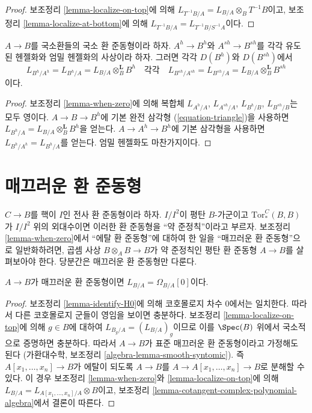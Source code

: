 \begin{proof}
보조정리 \ref{lemma-localize-on-top}에 의해
$L_{T^{-1}B/A}=L_{B/A}\otimes_BT^{-1}B$이고, 보조정리
\ref{lemma-localize-at-bottom}에 의해
$L_{T^{-1}B/A}=L_{T^{-1}B/S^{-1}A}$이다.
\end{proof}

\begin{lemma}
\label{lemma-cotangent-complex-henselization}
$A\to B$를 국소환들의 국소 환 준동형이라 하자. $A^h\to B^h$와
$A^{sh}\to B^{sh}$를 각각 유도된 헨젤화와 엄밀 헨젤화의 사상이라 하자.
그러면 각각 $D(B^h)$와 $D(B^{sh})$에서
$$
L_{B^h/A^h} = L_{B^h/A} = L_{B/A} \otimes_B^\mathbf{L} B^h
\quad\text{각각}\quad
L_{B^{sh}/A^{sh}} = L_{B^{sh}/A} = L_{B/A} \otimes_B^\mathbf{L} B^{sh}
$$
이다.
\end{lemma}

\begin{proof}
보조정리 \ref{lemma-when-zero}에 의해 복합체 $L_{A^h/A}$,
$L_{A^{sh}/A}$, $L_{B^h/B}$, $L_{B^{sh}/B}$는 모두 영이다.
$A\to B\to B^h$에 기본 완전 삼각형 (\ref{equation-triangle})을 사용하면
$L_{B^h/A}=L_{B/A}\otimes_B^\mathbf{L}B^h$을 얻는다.
$A\to A^h\to B^h$에 기본 삼각형을 사용하면
$L_{B^h/A^h}=L_{B^h/A}$를 얻는다. 엄밀 헨젤화도 마찬가지이다.
\end{proof}




\section{매끄러운 환 준동형}
\label{section-smooth}

\noindent
$C\to B$를 핵이 $I$인 전사 환 준동형이라 하자. $I/I^2$이 평탄
$B$-가군이고 $\text{Tor}_*^C(B,B)$가 $I/I^2$ 위의 외대수이면 이러한
환 준동형을 ``약 준정칙''이라고 부르자. 보조정리
\ref{lemma-when-zero}에서 ``에탈 환 준동형''에 대하여 한 일을
``매끄러운 환 준동형''으로 일반화하려면, 곱셈 사상
$B\otimes_AB\to B$가 약 준정칙인 평탄 환 준동형 $A\to B$를 살펴보아야
한다. 당분간은 매끄러운 환 준동형만 다룬다.

\begin{lemma}
\label{lemma-when-projective}
$A\to B$가 매끄러운 환 준동형이면 $L_{B/A}=\Omega_{B/A}[0]$이다.
\end{lemma}

\begin{proof}
보조정리 \ref{lemma-identify-H0}에 의해 코호몰로지 차수 $0$에서는
일치한다. 따라서 다른 코호몰로지 군들이 영임을 보이면 충분하다. 보조정리
\ref{lemma-localize-on-top}에 의해 $g\in B$에 대하여
$L_{B_g/A}=(L_{B/A})_g$이므로 이를 $\Spec(B)$ 위에서 국소적으로 증명하면
충분하다. 따라서 $A\to B$가 표준 매끄러운 환 준동형이라고 가정해도 된다
(가환대수학, 보조정리 \ref{algebra-lemma-smooth-syntomic}). 즉
$A[x_1,\ldots,x_n]\to B$가 에탈이 되도록 $A\to B$를
$A\to A[x_1,\ldots,x_n]\to B$로 분해할 수 있다. 이 경우 보조정리
\ref{lemma-when-zero}와 \ref{lemma-localize-on-top}에 의해
$L_{B/A}=L_{A[x_1,\ldots,x_n]/A}\otimes B$이고, 보조정리
\ref{lemma-cotangent-complex-polynomial-algebra}에서 결론이 따른다.
\end{proof}





